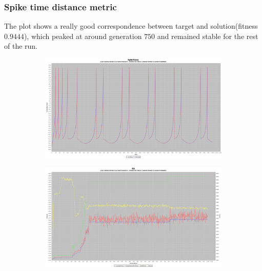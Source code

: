 \documentclass[10pt]{article}
\begin{document}
		\subsubsection{Spike time distance metric}
			The plot shows a really good correspondence between target and solution(fitness $0.9444$), which peaked at around generation $750$ and remained stable for the rest of the run.
			\begin{figure}[H]
				\centering
					\begin{subfigure}{.5\textwidth}
						\centering
						\includegraphics[width=\linewidth]{./../images/izzy2/time/plot.png}
						
						\label{fig:sub4a}
					\end{subfigure}%
					\begin{subfigure}{.5\textwidth}
						\centering
						\includegraphics[width=\linewidth]{./../images/izzy2/time/prog.png}
						
						\label{fig:sub4b}
					\end{subfigure}
					
					\label{fig:plot4}
			\end{figure}
			
\end{document}
